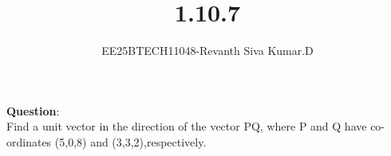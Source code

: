 \documentclass[journal]{IEEEtran}
\begin{document}

\vspace{3cm}
\title{1.10.7}
\author{EE25BTECH11048-Revanth Siva Kumar.D}
	\maketitle
	{\let\newpage\relax\maketitle}
	
	\renewcommand{\thefigure}{\theenumi}
	\renewcommand{\thetable}{\theenumi}
	\setlength{\intextsep}{12pt} %
	
	\renewcommand{\thetable}{\theenumi}
	
	\textbf{Question}:\\
    
         Find a unit vector in the direction of the vector PQ, where P and Q have co-ordinates (5,0,8) and (3,3,2),respectively.
         
\end{document}
